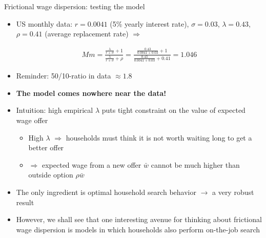 \documentclass[9pt]{beamer}
\newcommand{\bit}{\begin{itemize}}
\newcommand{\eit}{\end{itemize}}
\begin{document}
\begin{frame}{Frictional wage dispersion: testing the model}

\bit
\setlength\itemsep{1em}

\item US monthly data: $r=0.0041$ (5\% yearly interest rate), $\sigma = 0.03$, $\lambda=0.43$, $\rho=0.41$ (average replacement rate) $\Rightarrow$

\begin{eqnarray}
Mm =  \frac{\frac{\lambda}{r+\sigma}+1}{\frac{\lambda}{r+\sigma}+\rho} =  \frac{\frac{0.43}{0.0041+0.03}+1}{\frac{0.43}{0.0041+0.03}+0.41} = 1.046 \nonumber
\end{eqnarray}

\item Reminder: 50/10-ratio in data $\approx 1.8$

\item \bf The model comes nowhere near the data! \normalfont

\item Intuition: high empirical $\lambda$ puts tight constraint on the value of expected wage offer
\bit
\setlength\itemsep{0.5em}
	\item High $\lambda$ $\Rightarrow$ households must think it is not worth waiting long to get a better offer
	\item $\Rightarrow$ expected wage from a new offer $\bar w$ cannot be much higher than outside option $\rho \bar w$
\eit

\item The only ingredient is optimal household search behavior $\rightarrow$ a very robust result

\item However, we shall see that one interesting avenue for thinking about frictional wage dispersion is models in which households also perform on-the-job search

\eit
\end{frame}
\end{document}
